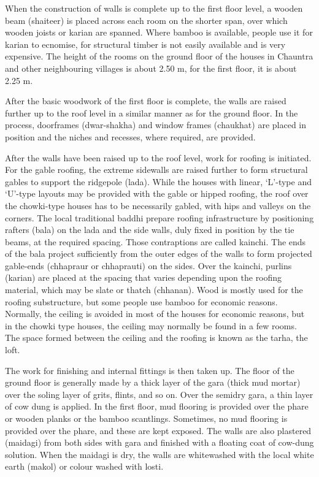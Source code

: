 When the construction of walls is complete up to the first floor level, a wooden beam (shaiteer) is placed across each room on the shorter span, over which wooden joists or karian are spanned. Where bamboo is available, people use it for karian to ecnomise, for structural timber is not easily available and is very expensive. The height of the rooms on the ground floor of the houses in Chauntra and other neighbouring villages is about 2.50 m, for the first floor, it is about 2.25 m.

After the basic woodwork of the first floor is complete, the walls are raised further up to the roof level in a similar manner as for the ground floor. In the process, doorframes (dwar-shakha) and window frames (chaukhat) are placed in position and the niches and recesses, where required, are provided.

After the walls have been raised up to the roof level, work for roofing is initiated. For the gable roofing, the extreme sidewalls are raised further to form structural gables to support the ridgepole (lada). While the houses with linear, ‘L’-type and ‘U’-type layouts may be provided with the gable or hipped roofing, the roof over the chowki-type houses has to be necessarily gabled, with hips and valleys on the corners. The local traditional baddhi prepare roofing infrastructure by positioning rafters (bala) on the lada and the side walls, duly fixed in position by the tie beams, at the required spacing. Those contraptions are called kainchi. The ends of the bala project sufficiently from the outer edges of the walls to form projected gable-ends (chhapraur or chhaprauti) on the sides. Over the kainchi, purlins (karian) are placed at the spacing that varies depending upon the roofing material, which may be slate or thatch (chhanan). Wood is mostly used for the roofing substructure, but some people use bamboo for economic reasons. Normally, the ceiling is avoided in most of the houses for economic reasons, but in the chowki type houses, the ceiling may normally be found in a few rooms. The space formed between the ceiling and the roofing is known as the tarha, the loft.

The work for finishing and internal fittings is then taken up. The floor of the ground floor is generally made by a thick layer of the gara (thick mud mortar) over the soling layer of grits, flints, and so on. Over the semidry gara, a thin layer of cow dung is applied. In the first floor, mud flooring is provided over the phare or wooden planks or the bamboo scantlings. Sometimes, no mud flooring is provided over the phare, and these are kept exposed. The walls are also plastered (maidagi) from both sides with gara and finished with a floating coat of cow-dung solution. When the maidagi is dry, the walls are whitewashed with the local white earth (makol) or colour washed with losti.


